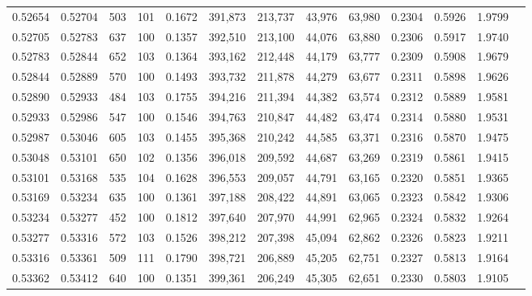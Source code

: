 \begin{tabular}{rrrrrrrrrrrrr}
0.52654 & 0.52704 &   503 & 101 &                                     0.1672 & 391,873 & 213,737 &  43,976 &  63,980 & 0.2304 & 0.5926 & 1.9799 \\
0.52705 & 0.52783 &   637 & 100 &                                     0.1357 & 392,510 & 213,100 &  44,076 &  63,880 & 0.2306 & 0.5917 & 1.9740 \\
0.52783 & 0.52844 &   652 & 103 &                                     0.1364 & 393,162 & 212,448 &  44,179 &  63,777 & 0.2309 & 0.5908 & 1.9679 \\
0.52844 & 0.52889 &   570 & 100 &                                     0.1493 & 393,732 & 211,878 &  44,279 &  63,677 & 0.2311 & 0.5898 & 1.9626 \\
0.52890 & 0.52933 &   484 & 103 &                                     0.1755 & 394,216 & 211,394 &  44,382 &  63,574 & 0.2312 & 0.5889 & 1.9581 \\
0.52933 & 0.52986 &   547 & 100 &                                     0.1546 & 394,763 & 210,847 &  44,482 &  63,474 & 0.2314 & 0.5880 & 1.9531 \\
0.52987 & 0.53046 &   605 & 103 &                                     0.1455 & 395,368 & 210,242 &  44,585 &  63,371 & 0.2316 & 0.5870 & 1.9475 \\
0.53048 & 0.53101 &   650 & 102 &                                     0.1356 & 396,018 & 209,592 &  44,687 &  63,269 & 0.2319 & 0.5861 & 1.9415 \\
0.53101 & 0.53168 &   535 & 104 &                                     0.1628 & 396,553 & 209,057 &  44,791 &  63,165 & 0.2320 & 0.5851 & 1.9365 \\
0.53169 & 0.53234 &   635 & 100 &                                     0.1361 & 397,188 & 208,422 &  44,891 &  63,065 & 0.2323 & 0.5842 & 1.9306 \\
0.53234 & 0.53277 &   452 & 100 &                                     0.1812 & 397,640 & 207,970 &  44,991 &  62,965 & 0.2324 & 0.5832 & 1.9264 \\
0.53277 & 0.53316 &   572 & 103 &                                     0.1526 & 398,212 & 207,398 &  45,094 &  62,862 & 0.2326 & 0.5823 & 1.9211 \\
0.53316 & 0.53361 &   509 & 111 &                                     0.1790 & 398,721 & 206,889 &  45,205 &  62,751 & 0.2327 & 0.5813 & 1.9164 \\
0.53362 & 0.53412 &   640 & 100 &                                     0.1351 & 399,361 & 206,249 &  45,305 &  62,651 & 0.2330 & 0.5803 & 1.9105 \\

\end{tabular}
